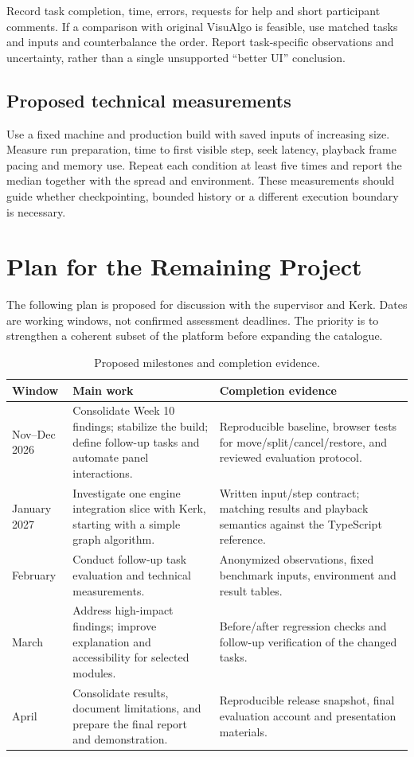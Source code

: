 \documentclass[11pt,a4paper]{article}
\newcommand{\page}{\par\penalty0 \ifdim\pagetotal>.72\textheight\clearpage\else\vspace{8pt}\fi}
\begin{document}
Record task completion, time, errors, requests for help and short participant comments. If a comparison with original VisuAlgo is feasible, use matched tasks and inputs and counterbalance the order. Report task-specific observations and uncertainty, rather than a single unsupported ``better UI'' conclusion.

\subsection{Proposed technical measurements}
Use a fixed machine and production build with saved inputs of increasing size. Measure run preparation, time to first visible step, seek latency, playback frame pacing and memory use. Repeat each condition at least five times and report the median together with the spread and environment. These measurements should guide whether checkpointing, bounded history or a different execution boundary is necessary.

\page
\section{Plan for the Remaining Project}
The following plan is proposed for discussion with the supervisor and Kerk. Dates are working windows, not confirmed assessment deadlines. The priority is to strengthen a coherent subset of the platform before expanding the catalogue.

\begin{table}[H]\small\centering
\caption{Proposed milestones and completion evidence.}\label{tab:plan}
\begin{tabularx}{\linewidth}{@{}p{20mm}p{48mm}X@{}}\toprule
Window & Main work & Completion evidence\\\midrule
Nov--Dec 2026 & Consolidate Week 10 findings; stabilize the build; define follow-up tasks and automate panel interactions. & Reproducible baseline, browser tests for move/split/cancel/restore, and reviewed evaluation protocol.\\
January 2027 & Investigate one engine integration slice with Kerk, starting with a simple graph algorithm. & Written input/step contract; matching results and playback semantics against the TypeScript reference.\\
February & Conduct follow-up task evaluation and technical measurements. & Anonymized observations, fixed benchmark inputs, environment and result tables.\\
March & Address high-impact findings; improve explanation and accessibility for selected modules. & Before/after regression checks and follow-up verification of the changed tasks.\\
April & Consolidate results, document limitations, and prepare the final report and demonstration. & Reproducible release snapshot, final evaluation account and presentation materials.\\\bottomrule
\end{tabularx}
\end{table}
\end{document}
